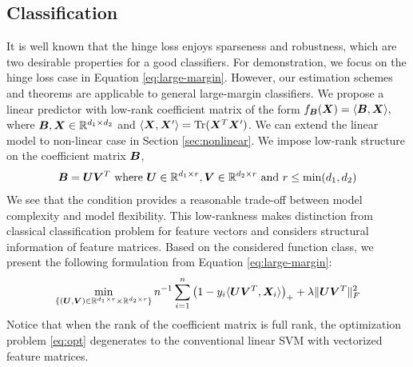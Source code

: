 \documentclass[12pt]{article}
\begin{document}
\subsection{Classification}
\label{subsec:pb1}
It is well known that the hinge loss enjoys sparseness and robustness, which are two desirable properties for a good classifiers. For demonstration, we focus on the hinge loss case in Equation \eqref{eq:large-margin}. However, our estimation schemes and theorems are applicable to general large-margin classifiers.
We propose a linear predictor with low-rank coefficient matrix  of the form $f_{\bm B}(\bm X) = \langle \bm B,\bm X\rangle,$
where $\bm B,\bm X\in\mathbb{R}^{d_1\times d_2}$ and $\langle \bm X,\bm X'\rangle = \text{Tr}(\bm X^T\bm X')$. We can extend the linear model to non-linear case in Section \ref{sec:nonlinear}.
We impose low-rank structure on the coefficient matrix $\bm B$,
\begin{align}
\bm B = \bm{U}\bm{V}^T \text{ where } \bm{U} \in\mathbb{R}^{d_1\times r} ,\bm{V}\in\mathbb{R}^{d_2\times r}\text{ and } r\leq\min(d_1,d_2)
\end{align}
 We  see that the condition provides a reasonable trade-off between model complexity and model flexibility. This low-rankness makes distinction from classical classification problem for feature vectors and considers structural information of feature matrices. Based on the considered function class, we present the following formulation from Equation \eqref{eq:large-margin}:
\begin{align}
\label{eq:opt}
\min_{\{(\bm{U},\bm{V})\in\mathbb{R}^{d_1\times r}\times \mathbb{R}^{d_2\times r}\}}n^{-1}\sum_{i=1}^n \left(1-y_i\langle \bm{U}\bm{V}^T,\bm X_i\rangle\right)_++\lambda \lVert\bm{U}\bm{V}^T\rVert_F^2
\end{align}
Notice that when the rank of the coefficient matrix is full rank, the optimization problem \eqref{eq:opt} degenerates to the conventional linear SVM with vectorized feature matrices.
\end{document}
